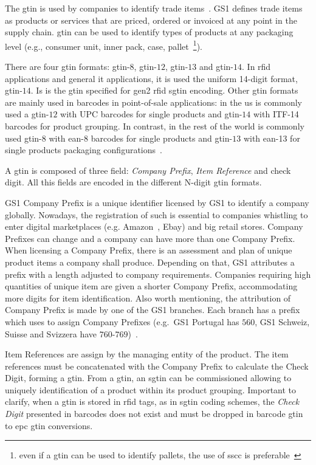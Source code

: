 The \ac{gtin} is used by companies to identify trade items~\cite{GS1GTINExecutive, GS1GTINManagement}. 
GS1 defines trade items as products or services that are priced, ordered or invoiced at any point in the supply chain.
\ac{gtin} can be used to identify types of products at any packaging level (e.g., consumer unit, inner pack, case, pallet~\footnote{even if a \ac{gtin} can be used to identify pallets, the use of \ac{sscc} is preferable~\cite{KeysImplementationGuideline}}).

There are four \ac{gtin} formats: \ac{gtin}-$8$, \ac{gtin}-$12$, \ac{gtin}-$13$ and \ac{gtin}-$14$. In \ac{rfid} applications and general \ac{it} applications, it is used the uniform 14-digit format, \ac{gtin}-$14$. Is is the \ac{gtin} specified for \ac{gen2} \ac{rfid} \ac{sgtin} encoding.
Other \ac{gtin} formats are mainly used in barcodes in point-of-sale applications: in the \ac{us} is commonly used a \ac{gtin}-$12$ with UPC barcodes for single products and \ac{gtin}-$14$ with ITF-14 barcodes for product grouping. In contrast, in the rest of the world is commonly used \ac{gtin}-$8$ with \ac{ean}-8 barcodes for single products and \ac{gtin}-$13$ with \ac{ean}-13 for single products packaging configurations~\cite{BarcodeGS1General, GS1BARCODECHART}.

A \ac{gtin} is composed of three field: \emph{Company Prefix}, \emph{Item Reference} and check digit. All this fields are encoded in the different N-digit \ac{gtin} formats. 

GS1 Company Prefix is a unique identifier licensed by GS1 to identify a company globally. 
Nowadays, the registration of such is essential to companies whistling to enter digital marketplaces (e.g. Amazon~\cite{ListingRequirementsProduct}, Ebay) and big retail stores.
Company Prefixes can change and a company can have more than one Company Prefix.
When licensing a Company Prefix, there is an assessment and plan of unique product items a company shall produce. 
Depending on that, GS1 attributes a prefix with a length adjusted to company requirements. 
Companies requiring high quantities of unique item are given a shorter Company Prefix, accommodating more digits for item identification.
Also worth mentioning, the attribution of Company Prefix is made by one of the GS1 branches. Each branch has a prefix which uses to assign Company Prefixes (e.g.\ GS1 Portugal has $560$, GS1 Schweiz, Suisse and Svizzera have $760$-$769$)~\cite{anonymousGS1CompanyPrefix2014}.

Item References are assign by the managing entity of the product.
The item references must be concatenated with the Company Prefix to calculate the Check Digit, forming a \ac{gtin}.
From a \ac{gtin}, an \ac{sgtin} can be commissioned allowing to uniquely identification of a product within its product grouping.
Important to clarify, when a \ac{gtin} is stored in \ac{rfid} tags, as in \ac{sgtin} coding schemes, the \emph{Check Digit} presented in barcodes does not exist and must be dropped in barcode \ac{gtin} to \ac{epc} \ac{gtin} conversions.


